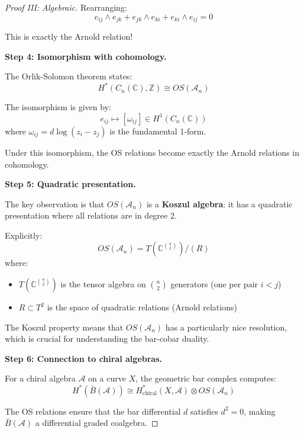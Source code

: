 \begin{proof}[Proof III: Algebraic]
Rearranging:
\begin{equation}
e_{ij} \wedge e_{jk} + e_{jk} \wedge e_{ki} + e_{ki} \wedge e_{ij} = 0
\end{equation}

This is exactly the Arnold relation!

\textbf{Step 4: Isomorphism with cohomology.}

The Orlik-Solomon theorem states:
\begin{equation}
H^*(C_n(\mathbb{C}), \mathbb{Z}) \cong OS(\mathcal{A}_n)
\end{equation}

The isomorphism is given by:
\begin{equation}
e_{ij} \mapsto [\omega_{ij}] \in H^1(C_n(\mathbb{C}))
\end{equation}
where $\omega_{ij} = d\log(z_i - z_j)$ is the fundamental 1-form.

Under this isomorphism, the OS relations become exactly the Arnold relations in cohomology.

\textbf{Step 5: Quadratic presentation.}

The key observation is that $OS(\mathcal{A}_n)$ is a \textbf{Koszul algebra}: it has a 
quadratic presentation where all relations are in degree 2.

Explicitly:
\begin{equation}
OS(\mathcal{A}_n) = T(\mathbb{C}^{\binom{n}{2}}) / (R)
\end{equation}
where:
\begin{itemize}
\item $T(\mathbb{C}^{\binom{n}{2}})$ is the tensor algebra on $\binom{n}{2}$ generators 
(one per pair $i < j$)
\item $R \subset T^2$ is the space of quadratic relations (Arnold relations)
\end{itemize}

The Koszul property means that $OS(\mathcal{A}_n)$ has a particularly nice resolution, 
which is crucial for understanding the bar-cobar duality.

\textbf{Step 6: Connection to chiral algebras.}

For a chiral algebra $\mathcal{A}$ on a curve $X$, the geometric bar complex computes:
\begin{equation}
H^*(\bar{B}(\mathcal{A})) \cong H^*_{\text{chiral}}(X, \mathcal{A}) \otimes OS(\mathcal{A}_n)
\end{equation}

The OS relations ensure that the bar differential $d$ satisfies $d^2 = 0$, making 
$\bar{B}(\mathcal{A})$ a differential graded coalgebra.

\end{proof}

